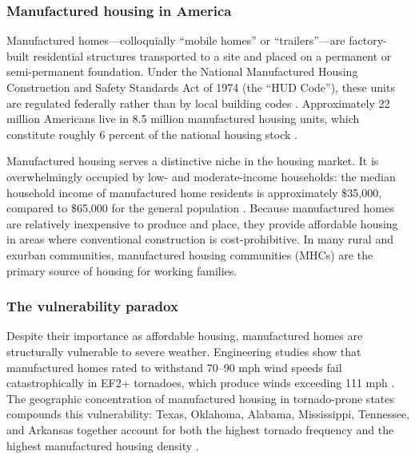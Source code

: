 \documentclass[12pt]{article}
\begin{document}
\subsubsection*{Manufactured housing in America} Manufactured homes---colloquially ``mobile homes'' or ``trailers''---are factory-built residential structures transported to a site and placed on a permanent or semi-permanent foundation. Under the National Manufactured Housing Construction and Safety Standards Act of 1974 (the ``HUD Code''), these units are regulated federally rather than by local building codes \citep{hudcode1974}. Approximately 22 million Americans live in 8.5 million manufactured housing units, which constitute roughly 6 percent of the national housing stock \citep{census2022acs}.

Manufactured housing serves a distinctive niche in the housing market. It is overwhelmingly occupied by low- and moderate-income households: the median household income of manufactured home residents is approximately \$35,000, compared to \$65,000 for the general population \citep{census2022acs}. Because manufactured homes are relatively inexpensive to produce and place, they provide affordable housing in areas where conventional construction is cost-prohibitive. In many rural and exurban communities, manufactured housing communities (MHCs) are the primary source of housing for working families.

\subsubsection*{The vulnerability paradox} Despite their importance as affordable housing, manufactured homes are structurally vulnerable to severe weather. Engineering studies show that manufactured homes rated to withstand 70--90 mph wind speeds fail catastrophically in EF2+ tornadoes, which produce winds exceeding 111 mph \citep{ashley2007spatial, strader2017tornado}. The geographic concentration of manufactured housing in tornado-prone states compounds this vulnerability: Texas, Oklahoma, Alabama, Mississippi, Tennessee, and Arkansas together account for both the highest tornado frequency and the highest manufactured housing density \citep{strader2017tornado}.
\end{document}
